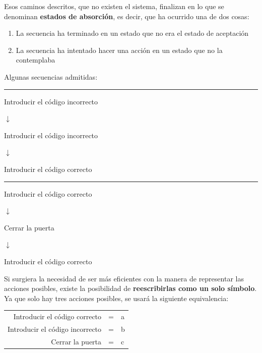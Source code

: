 Esos caminos descritos, que no existen el sistema, finalizan en lo que se denominan \textbf{estados de absorción}, es decir, que ha ocurrido una de dos cosas:

\begin{enumerate}
	\item La secuencia ha terminado en un estado que no era el estado de aceptación
	\item La secuencia ha intentado hacer una acción en un estado que no la contemplaba
\end{enumerate}

Algunas secuencias admitidas:

\begin{center}
	
	\rule{0.3\textwidth}{.4pt}

	Introducir el código incorrecto 
	
	$\downarrow$ 
	
	Introducir el código incorrecto 
	
	$\downarrow$ 
	
	Introducir el código correcto 
	
	\vsp

	\rule{0.3\textwidth}{.4pt}

	Introducir el código correcto 
	
	$\downarrow$ 
	
	Cerrar la puerta 
	
	$\downarrow$ 
	
	Introducir el código correcto 
	
\end{center}

Si surgiera la necesidad de ser más eficientes con la manera de representar las acciones posibles, existe la posibilidad de \textbf{reescribirlas como un solo símbolo}. Ya que solo hay tres acciones posibles, se usará la siguiente equivalencia:

\begin{center}
	
	\begin{tabular}{r r l}
		
		Introducir el código correcto & = & a \\
		Introducir el código incorrecto & = & b \\
		Cerrar la puerta & = & c \\
		
	\end{tabular}
\end{center}

